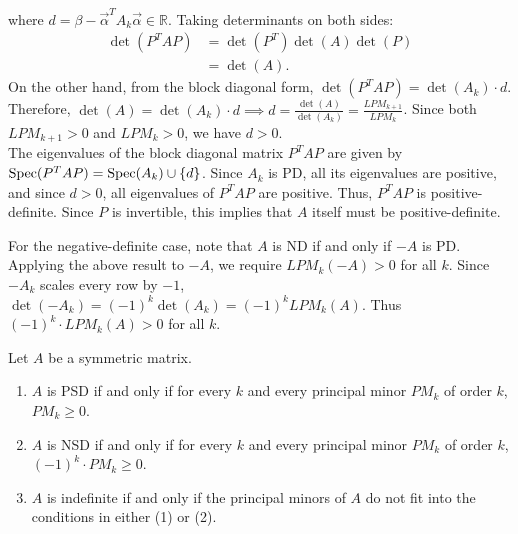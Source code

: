 \begin{pfbox}
\begin{itemize}
\[		      \]
		      where $d = \beta - \vec{\alpha}^T A_k \vec{\alpha} \in \mathbb{R}$. Taking determinants on both sides:
		      \begin{align*}
			      \det(P^TAP)
			       & = \det(P^T)\det(A)\det(P) \\
			       & = \det(A).
		      \end{align*}
		      On the other hand, from the block diagonal form, $\det(P^T A P) = \det(A_k) \cdot d$. Therefore, $\det(A) = \det(A_k) \cdot d \implies d = \frac{\det(A)}{\det(A_k)} = \frac{LPM_{k+1}}{LPM_k}$. Since both $LPM_{k+1} > 0$ and $LPM_k > 0$, we have $d > 0$.\\
		      The eigenvalues of the block diagonal matrix $P^T A P$ are given by $\operatorname{Spec}(P^T A P) = \operatorname{Spec}(A_k) \cup \{d\}$. Since $A_k$ is PD, all its eigenvalues are positive, and since $d > 0$, all eigenvalues of $P^T A P$ are positive. Thus, $P^T A P$ is positive-definite. Since $P$ is invertible, this implies that $A$ itself must be positive-definite.
	\end{itemize}
	For the negative-definite case, note that $A$ is ND if and only if $-A$ is PD. Applying the above result to $-A$, we require $LPM_k(-A) > 0$ for all $k$. Since $-A_k$ scales every row by $-1$, $\det(-A_k) = (-1)^k \det(A_k) = (-1)^k LPM_k(A)$. Thus $(-1)^k \cdot LPM_k(A) > 0$ for all $k$.
\end{pfbox}


\begin{theorem}
	Let $A$ be a symmetric matrix.
	\begin{enumerate}
		\item $A$ is PSD if and only if for every $k$ and every principal minor $PM_k$ of order $k$, $PM_k \ge 0$.
		\item $A$ is NSD if and only if for every $k$ and every principal minor $PM_k$ of order $k$, $(-1)^k \cdot PM_k \ge 0$.
		\item $A$ is indefinite if and only if the principal minors of $A$ do not fit into the conditions in either (1) or (2).
	\end{enumerate}
\end{theorem}


